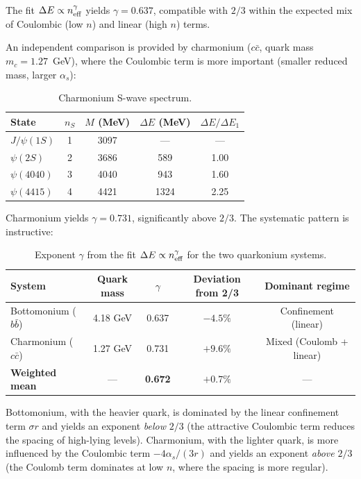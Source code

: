 \documentclass[10pt,a4paper]{article}
\begin{document}
The fit $\Delta E \propto n_{\rm eff}^\gamma$ yields $\gamma = 0.637$, compatible with $2/3$ within the expected mix of Coulombic (low $n$) and linear (high $n$) terms.

An independent comparison is provided by charmonium ($c\bar{c}$, quark mass $m_c = 1.27$~GeV), where the Coulombic term is more important (smaller reduced mass, larger $\alpha_s$):

\begin{table}[h]
\centering
\caption{Charmonium S-wave spectrum.}\label{tab:charmonium}
\begin{tabular}{lcccc}
\toprule
State & $n_S$ & $M$ (MeV) & $\Delta E$ (MeV) & $\Delta E / \Delta E_1$ \\
\midrule
$J/\psi(1S)$ & 1 & 3097 & --- & --- \\
$\psi(2S)$ & 2 & 3686 & 589 & 1.00 \\
$\psi(4040)$ & 3 & 4040 & 943 & 1.60 \\
$\psi(4415)$ & 4 & 4421 & 1324 & 2.25 \\
\bottomrule
\end{tabular}
\end{table}

Charmonium yields $\gamma = 0.731$, significantly above $2/3$. The systematic pattern is instructive:

\begin{table}[h]
\centering
\caption{Exponent $\gamma$ from the fit $\Delta E \propto n_{\rm eff}^\gamma$ for the two quarkonium systems.}\label{tab:quarkonium_combined}
\begin{tabular}{lcccc}
\toprule
System & Quark mass & $\gamma$ & Deviation from 2/3 & Dominant regime \\
\midrule
Bottomonium ($b\bar{b}$) & 4.18 GeV & 0.637 & $-4.5\%$ & Confinement (linear) \\
Charmonium ($c\bar{c}$) & 1.27 GeV & 0.731 & $+9.6\%$ & Mixed (Coulomb + linear) \\
\midrule
\textbf{Weighted mean} & --- & \textbf{0.672} & $+0.7\%$ & --- \\
\bottomrule
\end{tabular}
\end{table}

Bottomonium, with the heavier quark, is dominated by the linear confinement term $\sigma r$ and yields an exponent \textit{below} $2/3$ (the attractive Coulombic term reduces the spacing of high-lying levels). Charmonium, with the lighter quark, is more influenced by the Coulombic term $-4\alpha_s/(3r)$ and yields an exponent \textit{above} $2/3$ (the Coulomb term dominates at low $n$, where the spacing is more regular).
\end{document}

